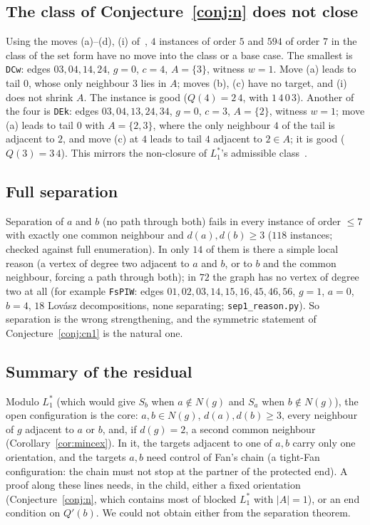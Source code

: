 \documentclass[11pt]{amsart}
\theoremstyle{definition}
\begin{document}
\subsection{The class of Conjecture~\ref{conj:n} does not close}
Using the moves (a)--(d), (i) of~\cite[Theorem~3.1]{L1I}, $4$ instances of order $5$ and $594$ of order
$7$ in the class of the set form have no move into the class or a base case. The smallest is
\texttt{DCw}: edges $03,04,14,24$, $g=0$, $c=4$, $A=\{3\}$, witness $w=1$. Move (a) leads to tail $0$,
whose only neighbour $3$ lies in $A$; moves (b), (c) have no target, and (i) does not shrink $A$. The
instance is good ($Q(4)=2\,4$, with $1\,4\,0\,3$). Another of the four is \texttt{DEk}: edges
$03,04,13,24,34$, $g=0$, $c=3$, $A=\{2\}$, witness $w=1$; move (a) leads to tail $0$ with
$A=\{2,3\}$, where the only neighbour $4$ of the tail is adjacent to $2$, and move (c) at $4$ leads to
tail $4$ adjacent to $2\in A$; it is good ($Q(3)=3\,4$). This mirrors the
non-closure of $L_1^*$'s admissible class~\cite[\S5]{L1I}.

\subsection{Full separation}
Separation of $a$ and $b$ (no path through both) fails in every instance of order $\le7$ with exactly
one common neighbour and $d(a),d(b)\ge3$ ($118$ instances; checked against full enumeration). In
only $14$ of them is there a simple local reason (a vertex of degree two adjacent to $a$ and $b$, or
to $b$ and the common neighbour, forcing a path through both); in $72$ the graph has no vertex of
degree two at all (for example \texttt{FsPIW}: edges $01,02,03,14,15,16,45,46,56$, $g=1$, $a=0$,
$b=4$, $18$ Lov\'asz decompositions, none separating; \texttt{sep1\_reason.py}). So separation is the
wrong strengthening, and the symmetric statement of Conjecture~\ref{conj:cn1} is the natural one.

\subsection{Summary of the residual}
Modulo $L_1^*$ (which would give $S_b$ when $a\notin N(g)$ and $S_a$ when $b\notin N(g)$), the open
configuration is the core: $a,b\in N(g)$, $d(a),d(b)\ge3$, every neighbour of $g$ adjacent to $a$ or
$b$, and, if $d(g)=2$, a second common neighbour (Corollary~\ref{cor:mincex}). In it, the targets adjacent to
one of $a,b$ carry only one orientation, and the targets $a,b$ need control of Fan's chain (a
tight-Fan configuration: the chain must not stop at the partner of the protected end). A proof
along these lines needs, in the child, either a fixed orientation (Conjecture~\ref{conj:n}, which
contains most of blocked $L_1^*$ with $|A|=1$), or an end condition on $Q'(b)$. We could not obtain
either from the separation theorem.
\end{document}
